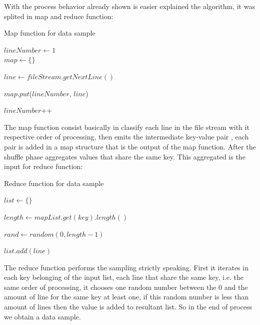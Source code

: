 With the process behavior already shown is easier explained the algorithm, it was
splited in map and reduce function:

\begin{algorithm}
		\caption{Map function for data sample \label{alg:map}}


		$lineNumber \leftarrow 1$\\
		$map \leftarrow  \{\}$

		 {

			$line \leftarrow fileStream.getNextLine()$

			$map.put$($lineNumber$, $line$)

			$lineNumber$++

		}

\end{algorithm}

The map function consist basically in classify each line in the file stream with
it respective order of processing, then emits the intermediate key-value pair ,
each pair is added in a map structure that is the output of the map function. After
the shuffle phase aggregates values that share the same key. This aggregated is
the input for reduce function:

\begin{algorithm}
		\caption{Reduce function for data sample \label{alg:reduce}}


		$list \leftarrow  \{\}$

		 {

			$length \leftarrow mapList.get(key).length()$

			 {
				$rand \leftarrow random(0, length - 1)$

				 {
					$list.add(line)$
				}

			}

		}

\end{algorithm}

The reduce function performs the sampling strictly speaking. First it iterates in
each key belonging of the input list, each line that share the same key, i.e. the
same order of processing, it chooses one random number between the 0 and the amount
of line for the same key at least one, if this random number is less than amount
of lines then the value is added to resultant list. So in the end of process we
obtain a data sample.
